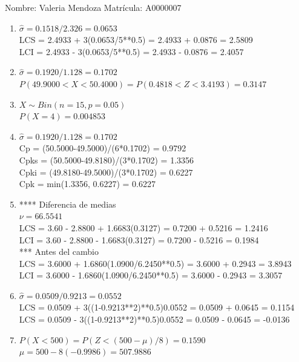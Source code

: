 \documentclass[8pt]{report}
\begin{document}
 \newpage

Nombre: \underline{\hspace*{.2in}}
Valeria Mendoza
\underline{\hspace*{.2in}} \quad Matr\'icula:\underline{\hspace*{.2in}}
A0000007
\underline{\hspace*{.2in}} \\

\begin{enumerate}
\item $\hat\sigma = 0.1518/2.326 = 0.0653$\\
LCS = 2.4933 + 3(0.0653/5**0.5) = 2.4933 + 0.0876 = 2.5809\\
LCI = 2.4933 - 3(0.0653/5**0.5) = 2.4933 - 0.0876 = 2.4057
\item $\hat\sigma = 0.1920/1.128 = 0.1702$\\
$P(49.9000 < X < 50.4000) = P(0.4818 < Z < 3.4193) = 0.3147$\\
\item $X \sim Bin(n=15, p=0.05)$\\
$P(X = 4) = 0.004853$
\item $\hat\sigma = 0.1920/1.128 = 0.1702$\\
Cp = (50.5000-49.5000)/(6*0.1702) = 0.9792\\
Cpks = (50.5000-49.8180)/(3*0.1702) = 1.3356\\
Cpki = (49.8180-49.5000)/(3*0.1702) = 0.6227\\
Cpk = min(1.3356, 0.6227) = 0.6227
\item **** Diferencia de medias\\
$\nu = 66.5541$\\
LCS = 3.60 - 2.8800 + 1.6683(0.3127) = 0.7200 + 0.5216 = 1.2416\\
LCI = 3.60 - 2.8800 - 1.6683(0.3127) = 0.7200 - 0.5216 = 0.1984\\
*** Antes del cambio\\
LCS = 3.6000 + 1.6860(1.0900/6.2450**0.5) = 3.6000 + 0.2943 = 3.8943\\
LCI = 3.6000 - 1.6860(1.0900/6.2450**0.5) = 3.6000 - 0.2943 = 3.3057\\
\item $\hat\sigma = 0.0509/0.9213 = 0.0552$\\
LCS = 0.0509 + 3((1-0.9213**2)**0.5)0.0552 = 0.0509 + 0.0645 = 0.1154\\
LCS = 0.0509 - 3((1-0.9213**2)**0.5)0.0552 = 0.0509 - 0.0645 = -0.0136
\item $P(X < 500) = P(Z < (500-\mu)/8) = 0.1590$\\
$\mu = 500 - 8(-0.9986) = 507.9886$\\
\end{enumerate}
\end{document}
